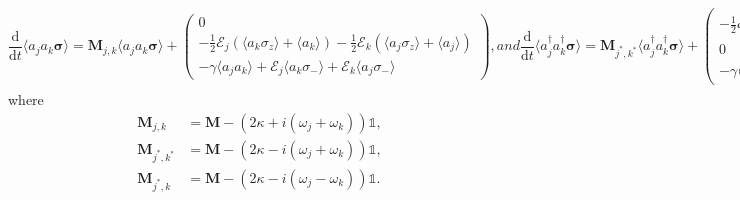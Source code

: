 \documentclass{article}
\newcommand{\ddt}[1][]{\frac{\mathrm{d} #1}{\mathrm{d}t}}
\begin{document}
\begin{subequations}
	\begin{equation}
		\ddt \langle a_{j} a_{k} \bm{\sigma} \rangle = \bm{M}_{j, k} \langle a_{j} a_{k} \bm{\sigma} \rangle +
		\begin{pmatrix}
			0 \\
			-\frac{1}{2} \mathcal{E}_{j} \left( \langle a_{k} \sigma_{z} \rangle + \langle a_{k} \rangle \right) - \frac{1}{2} \mathcal{E}_{k} \left( \langle a_{j} \sigma_{z} \rangle + \langle a_{j} \rangle \right) \\
			-\gamma \langle a_{j} a_{k} \rangle + \mathcal{E}_{j} \langle a_{k} \sigma_{-} \rangle + \mathcal{E}_{k} \langle a_{j} \sigma_{-} \rangle
		\end{pmatrix},
	\end{equation}
	and
	\begin{equation}
		\ddt \langle a^{\dagger}_{j} a^{\dagger}_{k} \bm{\sigma} \rangle = \bm{M}_{j^{*}, k^{*}} \langle a^{\dagger}_{j} a^{\dagger}_{k} \bm{\sigma} \rangle +
		\begin{pmatrix}
			-\frac{1}{2} \mathcal{E}_{j}^{*} \left( \langle a^{\dagger}_{k} \sigma_{z} \rangle + \langle a^{\dagger}_{k} \rangle \right) - \frac{1}{2} \mathcal{E}_{k}^{*} \left( \langle a^{\dagger}_{j} \sigma_{z} \rangle + \langle a^{\dagger}_{j} \rangle \right) \\
			0 \\
			-\gamma \langle a^{\dagger}_{j} a^{\dagger}_{k} \rangle + \mathcal{E}_{j}^{*} \langle a^{\dagger}_{k} \sigma_{+} \rangle + \mathcal{E}_{k}^{*} \langle a^{\dagger}_{j} \sigma_{+} \rangle
		\end{pmatrix},
	\end{equation}
	and
	\begin{equation}
	\ddt \langle a^{\dagger}_{j} a_{k} \bm{\sigma} \rangle = \bm{M}_{j^{*}, k} \langle a^{\dagger}_{j} a_{k} \bm{\sigma} \rangle +
	\begin{pmatrix}
		-\frac{1}{2} \mathcal{E}_{j}^{*} \left( \langle a_{k} \sigma_{z} \rangle + \langle a_{k} \rangle \right) \\
		-\frac{1}{2} \mathcal{E}_{k} \left( \langle a^{\dagger}_{j} \sigma_{z} \rangle + \langle a^{\dagger}_{j} \rangle \right) \\
		-\gamma \langle a^{\dagger}_{j} a_{k} \rangle + \mathcal{E}_{j}^{*} \langle a_{k} \sigma_{+} \rangle + \mathcal{E}_{k} \langle a^{\dagger}_{j} \sigma_{-} \rangle
	\end{pmatrix},
	\end{equation}
\end{subequations}
where
\begin{subequations}
	\begin{align}
		\bm{M}_{j, k} &= \bm{M} - \left( 2 \kappa + i \left( \omega_{j} + \omega_{k} \right) \right) \mathbb{1}, \\
		\bm{M}_{j^{*}, k^{*}} &= \bm{M} - \left( 2 \kappa - i \left( \omega_{j} + \omega_{k} \right) \right) \mathbb{1}, \\
		\bm{M}_{j^{*}, k} &= \bm{M} - \left( 2 \kappa - i \left( \omega_{j}- \omega_{k} \right) \right) \mathbb{1}.
	\end{align}
\end{subequations}
\end{document}
